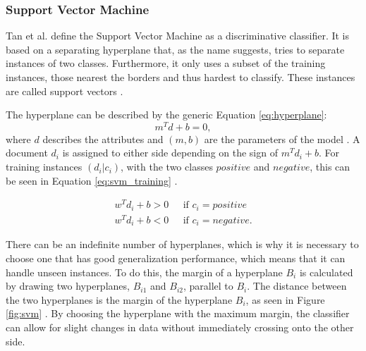 \subsubsection{Support Vector Machine}
Tan et al. define the Support Vector Machine as a discriminative classifier. It is based on a separating hyperplane that, as the name suggests, tries to separate instances of two classes. Furthermore, it only uses a subset of the training instances, those nearest the borders and thus hardest to classify. These instances are called support vectors \cite{DBLP:books/aw/TanSKK2019}.

The hyperplane can be described by the generic Equation \eqref{eq:hyperplane}:
    \begin{equation}
            \label{eq:hyperplane}
                m^Td + b = 0,
        \end{equation}
    where $d$ describes the attributes and $(m, b)$ are the parameters of the model \cite{DBLP:books/aw/TanSKK2019}. A document $d_i$ is assigned to either side depending on the sign of $m^Td_i + b$. For training instances $(d_i|c_i)$, with the two classes $positive$ and $negative$, this can be seen in Equation \eqref{eq:svm_training} \cite{DBLP:books/aw/TanSKK2019}.
    
    \begin{equation}
            \begin{split}
            \label{eq:svm_training}
                w^Td_i + b > 0 & \text{~~if~} c_i = positive \\
                w^Td_i + b < 0 & \text{~~if~} c_i = negative.
            \end{split}
    \end{equation}
    
    There can be an indefinite number of hyperplanes, which is why it is necessary to choose one that has good generalization performance, which means that it can handle unseen instances. To do this, the margin of a hyperplane $B_i$ is calculated by drawing two hyperplanes, $B_{i1}$ and $B_{i2}$, parallel to $B_i$. The distance between the two hyperplanes is the margin of the hyperplane $B_i$, as seen in Figure \ref{fig:svm} \cite{DBLP:books/aw/TanSKK2019}. By choosing the hyperplane with the maximum margin, the classifier can allow for slight changes in data without immediately crossing onto the other side.

